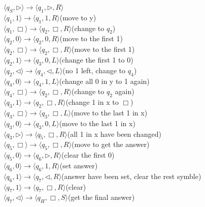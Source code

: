 \documentclass[12pt,a4paper]{article}
\theoremstyle{definition}
\begin{document}
\begin{enumerate}
$\langle q_S, \triangleright \rangle \rightarrow \langle q_1, \triangleright,  R\rangle$\\
$\langle q_1,  1\rangle \rightarrow \langle q_1, 1,  R\rangle$\qquad(move to y)\\
$\langle q_1,  \Box\rangle \rightarrow \langle q_2, \Box,  R\rangle$\qquad(change to $q_2$)\\
$\langle q_2,  0\rangle \rightarrow \langle q_2, 0,  R\rangle$\qquad(move to the first 1)\\
$\langle q_2,  \Box\rangle \rightarrow \langle q_2, \Box,  R\rangle$\qquad(move to the first 1)\\
$\langle q_2,  1\rangle \rightarrow \langle q_3, 0,  L\rangle$\qquad(change the first 1 to 0)\\
$\langle q_2,  \triangleleft\rangle \rightarrow \langle q_4, \triangleleft,  L\rangle$\qquad(no 1 left, change to $q_4$)\\
$\langle q_4,  0\rangle \rightarrow \langle q_4, 1,  L\rangle$\qquad(change all 0 in y to 1 again)\\
$\langle q_4,  \Box\rangle \rightarrow \langle q_2, \Box,  R\rangle$\qquad(change to $q_2$ again)\\
$\langle q_3,  1\rangle \rightarrow \langle q_2, \Box,  R\rangle$\qquad(change 1 in x to $\Box$)\\
$\langle q_3,  \Box\rangle \rightarrow \langle q_3, \Box,  L\rangle$\qquad(move to the last 1 in x)\\
$\langle q_3,  0\rangle \rightarrow \langle q_3, 0,  L\rangle$\qquad(move to the last 1 in x)\\
$\langle q_3,  \triangleright\rangle \rightarrow \langle q_5, \Box,  R\rangle$\qquad(all 1 in x have been changed)\\
$\langle q_5,  \Box\rangle \rightarrow \langle q_5, \Box,  R\rangle$\qquad(move to get the answer)\\
$\langle q_5,  0\rangle \rightarrow \langle q_6, \triangleright,  R\rangle$\qquad(clear the first 0)\\
$\langle q_6,  0\rangle \rightarrow \langle q_6, 1,  R\rangle$\qquad(set answer)\\
$\langle q_6,  1\rangle \rightarrow \langle q_7, \triangleleft,  R\rangle$\qquad(answer have been set, clear the rest symble)\\
$\langle q_7,  1\rangle \rightarrow \langle q_7, \Box,  R\rangle$\qquad(clear)\\
$\langle q_7,  \triangleleft\rangle \rightarrow \langle q_H, \Box,  S\rangle$\qquad(get the final answer)\\


\end{enumerate}
\end{document}
